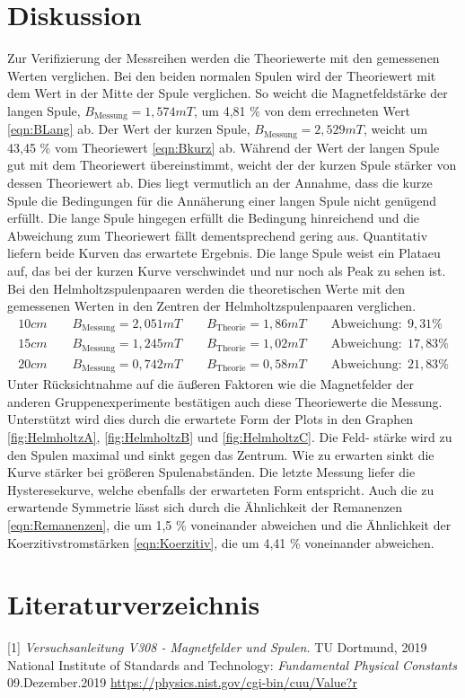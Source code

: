 \documentclass[titlepage = firstcover]{scrartcl}
\begin{document}
\section{Diskussion}
        Zur Verifizierung der Messreihen werden die Theoriewerte mit den gemessenen Werten verglichen. Bei den beiden normalen Spulen wird der Theoriewert mit
        dem Wert in der Mitte der Spule verglichen. So weicht die Magnetfeldstärke der langen Spule, $B_{\text{Messung}} = 1,574 mT$,  um 4,81 \% von dem errechneten Wert 
        \ref{eqn:BLang} ab. Der Wert der kurzen Spule, $B_{\text{Messung}} = 2,529 mT$, weicht um 43,45 \% vom Theoriewert \ref{eqn:Bkurz} ab. Während der Wert
        der langen Spule gut mit dem Theoriewert übereinstimmt, weicht der der kurzen Spule stärker von dessen Theoriewert ab. Dies liegt vermutlich an der 
        Annahme, dass die kurze Spule die Bedingungen für die Annäherung einer langen Spule nicht genügend erfüllt. Die lange Spule hingegen erfüllt die 
        Bedingung hinreichend und die Abweichung zum Theoriewert fällt dementsprechend gering aus. Quantitativ liefern 
        beide Kurven das erwartete Ergebnis. Die lange Spule weist ein Plataeu auf, das bei der kurzen Kurve verschwindet und nur noch als Peak zu sehen ist.
        Bei den Helmholtzspulenpaaren werden die theoretischen Werte mit den gemessenen Werten in den Zentren der Helmholtzspulenpaaren verglichen.
        \begin{align*}
            10cm \qquad B_{\text{Messung}} = 2,051 mT \qquad B_{\text{Theorie}} = 1,86 mT \qquad \text{Abweichung}: \; 9,31 \% \\
            15cm \qquad B_{\text{Messung}} = 1,245 mT \qquad B_{\text{Theorie}} = 1,02 mT \qquad \text{Abweichung}: \; 17,83 \% \\
            20cm \qquad B_{\text{Messung}} = 0,742 mT \qquad B_{\text{Theorie}} = 0,58 mT \qquad \text{Abweichung}: \; 21,83 \% 
        \end{align*}
        Unter Rücksichtnahme auf die äußeren Faktoren wie die Magnetfelder der anderen Gruppenexperimente bestätigen auch diese Theoriewerte die Messung.
        Unterstützt wird dies durch die erwartete Form der Plots in den Graphen \ref{fig:HelmholtzA}, \ref{fig:HelmholtzB} und \ref{fig:HelmholtzC}. Die Feld-
        stärke wird zu den Spulen maximal und sinkt gegen das Zentrum. Wie zu erwarten sinkt die Kurve stärker bei größeren Spulenabständen.
        Die letzte Messung liefer die Hysteresekurve, welche ebenfalls der erwarteten Form entspricht. Auch die zu erwartende Symmetrie lässt sich durch die 
        Ähnlichkeit der Remanenzen \ref{eqn:Remanenzen}, die um 1,5 \% voneinander abweichen und die Ähnlichkeit der Koerzitivstromstärken \ref{eqn:Koerzitiv},
        die um 4,41 \% voneinander abweichen. 

\newpage
\section{Literaturverzeichnis}
        [1] \textit{Versuchsanleitung V308 - Magnetfelder und Spulen.} TU Dortmund, 2019 \newline
        [2] National Institute of Standards and Technology: \textit{Fundamental Physical Constants} 09.Dezember.2019
            \url{https://physics.nist.gov/cgi-bin/cuu/Value?r}
\end{document}
